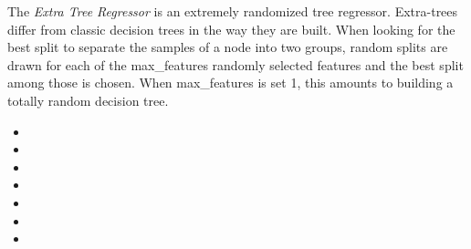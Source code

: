 The \textit{Extra Tree Regressor} is an extremely randomized tree regressor.
%
Extra-trees differ from classic decision trees in the way they are built.
%
When looking for the best split to separate the samples of a node into two
groups, random splits are drawn for each of the max\_features randomly selected
features and the best split among those is chosen.
%
When max\_features is set 1, this amounts to building a totally random decision
tree.


\begin{itemize}
  \item {}
  \item {}
  \item {}
  \item {}
  \item {}
  \item {}
  \item {}
\end{itemize}

